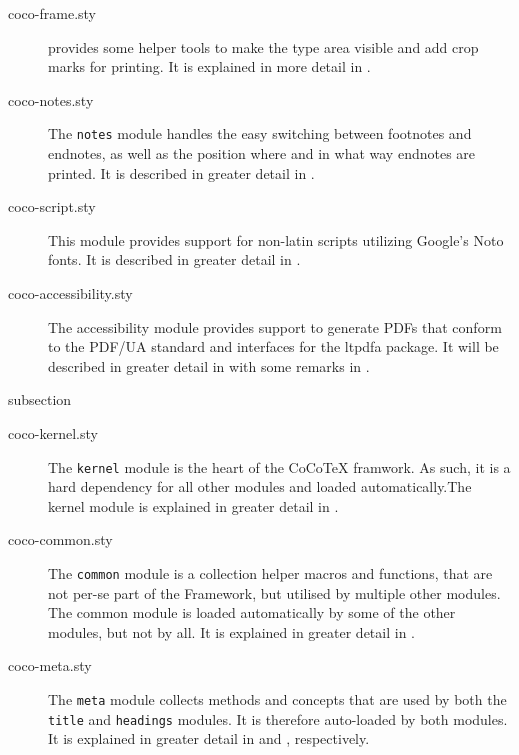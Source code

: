 \begin{description}
\item[\ttfamily coco-frame.sty] 
  provides some helper tools to make the type area visible and add
  crop marks for printing. It is explained in more detail in
  .
\item[\ttfamily coco-notes.sty] The \lstinline{notes}
  module handles the easy switching between
  footnotes and endnotes, as well as the position where and in what
  way endnotes are printed. It is described in greater detail in
  .
\item[\ttfamily coco-script.sty] This module provides support for
  non-latin scripts utilizing Google's Noto fonts. It is described in
  greater detail in .
\item[\ttfamily coco-accessibility.sty] The
  accessibility
  module provides support to generate PDFs
  that conform to the PDF/UA standard and interfaces for the ltpdfa
  package. It will be described in greater detail in
   with some remarks in .
\end{description}


\begin{Heading}{subsection}
\end{Heading}

\begin{description}
\item[\ttfamily coco-kernel.sty] The
  \lstinline{kernel} module is the
  heart of the CoCoTeX framwork. As such, it is a hard dependency for
  all other modules and loaded automatically.The kernel module is
  explained in greater detail in .
\item[\ttfamily coco-common.sty] The
  \lstinline{common} module is a
  collection helper macros and functions, that are not per-se part of
  the {\CoCoTeX} Framework, but utilised by multiple other
  modules. The common module is loaded automatically by some of the
  other modules, but not by all. It is explained in greater detail in
  .
\item[\ttfamily coco-meta.sty] The \lstinline{meta}
  module collects methods and concepts that are used by
  both the \lstinline{title} and \lstinline{headings} modules. It is
  therefore auto-loaded by both modules. It is explained in greater
  detail in  and ,
  respectively.
\end{description}
